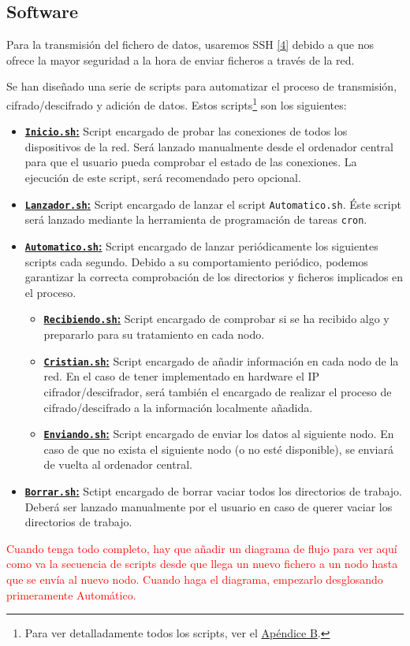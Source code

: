 \subsection{Software}
Para la transmisión del fichero de datos, usaremos SSH \hyperlink{4}{[4]} debido a que nos ofrece la mayor seguridad a la hora de enviar ficheros a través de la red.

Se han diseñado una serie de scripts para automatizar el proceso de transmisión, cifrado/descifrado y adición de datos. Estos scripts\footnote{Para ver detalladamente todos los scripts, ver el \hyperlink{Scripts}{Apéndice B}.} son los siguientes:
\begin{itemize}
	\item \hyperlink{ScriptConexion}{\textbf{\texttt{Inicio.sh}:}} Script encargado de probar las conexiones de todos los dispositivos de la red. Será lanzado manualmente desde el ordenador central para que el usuario pueda comprobar el estado de las conexiones. La ejecución de este script, será recomendado pero opcional.
	\item \hyperlink{ScriptLanzador}{\textbf{\texttt{Lanzador.sh}:}} Script encargado de lanzar el script \texttt{Automatico.sh}. Éste script será lanzado mediante la herramienta de programación de tareas \texttt{cron}.
	\item \hyperlink{ScriptAutomatico}{\textbf{\texttt{Automatico.sh}:}} Script encargado de lanzar periódicamente los siguientes scripts cada segundo. Debido a su comportamiento periódico, podemos garantizar la correcta comprobación de los directorios y ficheros implicados en el proceso.
	\begin{itemize}
		\item \hyperlink{ScriptRecibiendo}{\textbf{\texttt{Recibiendo.sh}:}} Script encargado de comprobar si se ha recibido algo y prepararlo para su tratamiento en cada nodo.
		\item \hyperlink{ScriptCristian}{\textbf{\texttt{Cristian.sh}:}} Script encargado de añadir información en cada nodo de la red. En el caso de tener implementado en hardware el IP cifrador/descifrador, será también el encargado de realizar el proceso de cifrado/descifrado a la información localmente añadida.
		\item \hyperlink{ScriptEnviando}{\textbf{\texttt{Enviando.sh}:}} Script encargado de enviar los datos al siguiente nodo. En caso de que no exista el siguiente nodo (o no esté disponible), se enviará de vuelta al ordenador central.
	\end{itemize}
	\item \hyperlink{ScriptBorrar}{\textbf{\texttt{Borrar.sh}:}} Sctipt encargado de borrar vaciar todos los directorios de trabajo. Deberá ser lanzado manualmente por el usuario en caso de querer vaciar los directorios de trabajo.
\end{itemize}

\textcolor{red}{Cuando tenga todo completo, hay que añadir un diagrama de flujo para ver aquí como va la secuencia de scripts desde que llega un nuevo fichero a un nodo hasta que se envía al nuevo nodo. Cuando haga el diagrama, empezarlo desglosando primeramente Automático.}